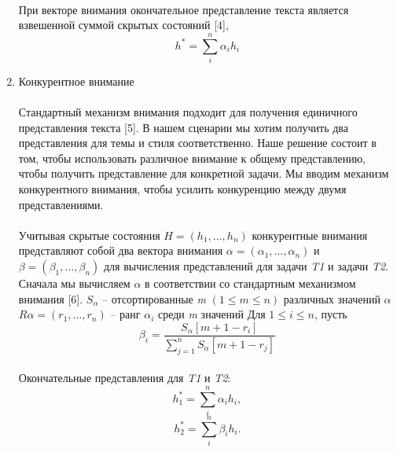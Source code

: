 \begin{enumerate}[label={\arabic*)}, left=10pt]
\paragraph*{} При векторе внимания окончательное представление текста является взвешенной суммой скрытых состояний [4],
\begin{equation}
    h^{*} = \sum^n_i{\alpha_i h_i}
\end{equation}
\item Конкурентное внимание
\paragraph*{}Стандартный механизм внимания подходит для получения единичного представления текста [5]. В нашем сценарии мы хотим получить два представления для темы 
и стиля соответственно. Наше решение состоит в том, чтобы использовать различное 
внимание к общему представлению, чтобы получить представление для конкретной задачи. Мы вводим механизм конкурентного 
внимания, чтобы усилить конкуренцию 
между двумя представлениями.
\paragraph*{}Учитывая скрытые состояния $\mathit{H} = (h_1, \ldots, h_n)$ конкурентные внимания представляют 
собой два вектора внимания $\alpha = (\alpha_1, \ldots, \alpha_n)$ и $\beta = (\beta_1, \ldots, \beta_n)$ для вычисления представлений для задачи \textit{T1} и задачи \textit{T2}.
Сначала мы вычисляем $\alpha$ в соответствии со стандартным механизмом внимания [6]. $S_\alpha$ – отсортированные \textit{m} $(1 \leq m \leq n)$ различных значений $\alpha$ $R\alpha = (r_1,\ldots,r_n)$ – ранг $\alpha_i$
среди \textit{m} значений  Для $1 \leq i \leq n$, пусть
\begin{equation*}
    \beta_i = \frac{S_{\alpha}[m+1-r_i]}{\sum^n_{j=1}S_{\alpha}[m+1-r_j]}
\end{equation*}
\paragraph*{}Окончательные представления для \textit{T1} и \textit{T2}:
\begin{equation*}
    h^{*}_1 =\sum^n_i{\alpha_i h_i},
\end{equation*}
\begin{equation*}
    h^{*}_2 = \sum^n_i{\beta_i h_i}.
\end{equation*}
\end{enumerate}

